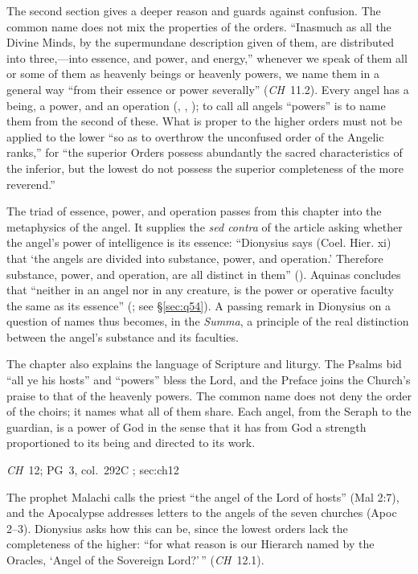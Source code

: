 The second section gives a deeper reason and guards against confusion.
The common name does not mix the properties of the orders. ``Inasmuch as
all the Divine Minds, by the supermundane description given of them, are
distributed into three,---into essence, and power, and energy,''
whenever we speak of them all or some of them as heavenly beings or
heavenly powers, we name them in a general way ``from their essence or
power severally'' (\emph{CH}~11.2). Every angel has a being, a power, and
an operation (, , ); to call all
angels ``powers'' is to name them from the second of these. What is
proper to the higher orders must not be applied to the lower ``so as to
overthrow the unconfused order of the Angelic ranks,'' for ``the
superior Orders possess abundantly the sacred characteristics of the
inferior, but the lowest do not possess the superior completeness of the
more reverend.''

The triad of essence, power, and operation passes from this chapter into
the metaphysics of the angel. It supplies the \emph{sed contra} of the
article asking whether the angel's power of intelligence is its essence:
``Dionysius says (Coel. Hier. xi) that `the angels are divided into
substance, power, and operation.' Therefore substance, power, and
operation, are all distinct in them'' (). Aquinas
concludes that ``neither in an angel nor in any creature, is the power
or operative faculty the same as its essence'' (;
see \S\ref{sec:q54}). A passing remark in Dionysius on a question of names
thus becomes, in the \emph{Summa}, a principle of the real distinction
between the angel's substance and its faculties.

The chapter also explains the language of Scripture and liturgy. The
Psalms bid ``all ye his hosts'' and ``powers'' bless the Lord, and the
Preface joins the Church's praise to that of the heavenly powers. The
common name does not deny the order of the choirs; it names what all of
them share. Each angel, from the Seraph to the guardian, is a power of
God in the sense that it has from God a strength proportioned to its
being and directed to its work.

{\emph{CH}~12; PG~3, col.~292C}
{; }{sec:ch12}

The prophet Malachi calls the priest ``the angel of the Lord of hosts''
(Mal 2:7), and the Apocalypse addresses letters to the angels of the
seven churches (Apoc 2--3). Dionysius asks how this can be, since the
lowest orders lack the completeness of the higher: ``for what reason is
our Hierarch named by the Oracles, `Angel of the Sovereign Lord?'\,''
(\emph{CH}~12.1).

